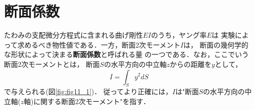 ﻿\documentclass[10pt,a4j]{jbook}
\newlength{\minitwocolumn}
\begin{document}
\newcommand{\fat}[1]{\mbox{\boldmath $#1$}}
\newcommand{\D}{\partial}
\newcommand{\w}{\omega}
\newcommand{\ga}{\alpha}
\newcommand{\gb}{\beta}
\newcommand{\gx}{\xi}
\newcommand{\gz}{\zeta}
\newcommand{\vhat}[1]{\hat{\fat{#1}}}
\newcommand{\spc}{\vspace{0.7\baselineskip}}
\newcommand{\halfspc}{\vspace{0.3\baselineskip}}

\newcommand{\twofig}[2]
 {
   \begin{figure}
     \begin{minipage}[t]{\minitwocolumn}
         \begin{center}   #1
         \end{center}
     \end{minipage}
         \hspace{\columnsep}
     \begin{minipage}[t]{\minitwocolumn}
         \begin{center} #2
         \end{center}
     \end{minipage}
   \end{figure}
 }
\setcounter{chapter}{7}
\chapter{断面係数}
たわみの支配微分方程式に含まれる曲げ剛性$EI$のうち，ヤング率$E$は
実験によって求めるべき物性値である．一方，断面2次モーメント$I$は，
断面の幾何学的な形状によって決まる{\bf 断面係数}と呼ばれる量
の一つである．なお，ここでいう断面2次モーメントとは，
断面$S$の水平方向の中立軸$z$からの距離を$y$として，
\begin{equation}
	I=\int_S y^2 dS
	\label{eqn:Iz_xy}
\end{equation}
で与えられる(図\ref{fig:fig11_1})．
従ってより正確には，$I$は"断面$S$の水平方向の中立軸($z$軸)に関する断面2次モーメント"を指す．
\end{document}
